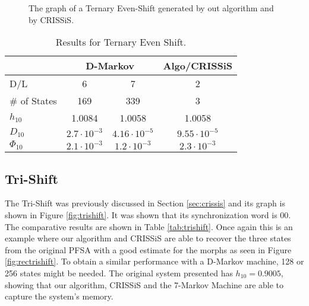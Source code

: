 {\begin{figure}
\centering
{}
\caption{The graph of a Ternary Even-Shift generated by out algorithm and by CRISSiS.\label{fig:ternaryevengen}}
\end{figure}

\begin{table}
\centering
\begin{tabular}{|l|c|c|c|}
\hline
 & \multicolumn{2}{c|}{\textbf{D-Markov}} & \textbf{Algo/CRISSiS}\\
 \hline
D/L & 6 & 7 & 2 \\
\hline
\# of States & 169 & 339 & 3 \\ 
$h_{10}$ & 1.0084 & 1.0058 & 1.0058 \\
$D_{10}$ & $2.7\cdot10^{-3}$ & $4.16\cdot10^{-5}$ & $9.55\cdot10^{-5}$ \\
$\Phi_{10}$  & $2.1\cdot10^{-3}$ & $1.2\cdot10^{-3}$ & $2.3\cdot10^{-3}$ \\
 \hline
\end{tabular}
\caption{Results for Ternary Even Shift. \label{tab:ternaryeven}}
\end{table}

\subsection{Tri-Shift}

The Tri-Shift was previously discussed in Section \ref{sec:crissis} and its graph is shown in Figure \ref{fig:trishift}. It was shown that its synchronization word is 00. The comparative results are shown in Table \ref{tab:trishift}. Once again this is an example where our algorithm and CRISSiS are able to recover the three states from the original PFSA with a good estimate for the morphs as seen in Figure \ref{fig:rectrishift}. To obtain a similar performance with a D-Markov machine, 128 or 256 states might be needed. The original system presented has $h_{10} = 0.9005$, showing that our algorithm, CRISSiS and the 7-Markov Machine are able to capture the system's memory.


}
